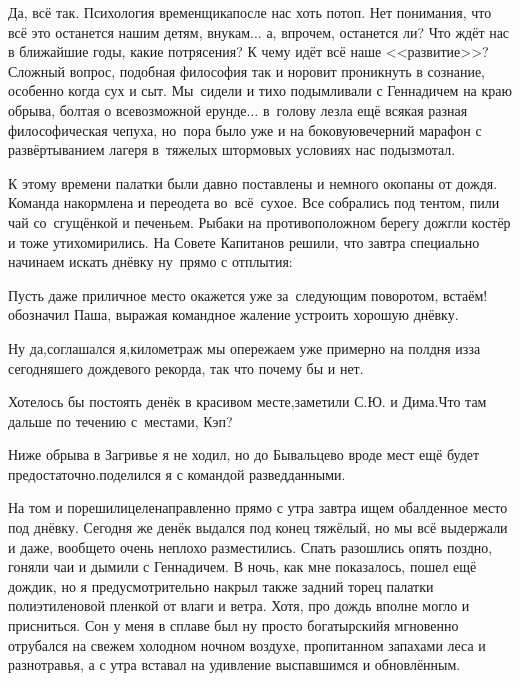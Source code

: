 Да, всё так. Психология временщика\mdash после нас хоть потоп. Нет понимания, что всё это останется нашим детям, внукам$\ldots$ а, впрочем, останется ли? Что ждёт нас в ближайшие годы, какие потрясения? К чему идёт всё наше <<развитие>>? Сложный вопрос, подобная философия так и норовит проникнуть в сознание, особенно когда сух и сыт. Мы~сидели и тихо подымливали с Геннадичем на краю обрыва, болтая о всевозможной ерунде$\ldots$ в~голову лезла ещё всякая разная философическая чепуха, но~пора было уже и на боковую\mdash вечерний марафон с развёртыванием лагеря в~тяжелых штормовых условиях нас подызмотал.

К этому времени палатки были давно поставлены и немного окопаны от дождя. Команда накормлена и переодета во~всё~сухое. Все собрались под тентом, пили чай со~сгущёнкой и печеньем. Рыбаки на противоположном берегу дожгли костёр и тоже утихомирились. На Совете Капитанов решили, что завтра специально начинаем искать днёвку ну~прямо с отплытия:

\diagdash Пусть даже приличное место окажется уже за~следующим поворотом, встаём!\mdash обозначил Паша, выражая командное жаление устроить хорошую днёвку.

\diagdash Ну да,\mdash соглашался я,\mdash километраж мы опережаем уже примерно на полдня из\sdash за сегодняшего дождевого рекорда, так что почему бы и нет.

\diagdash Хотелось бы постоять денёк в красивом месте,\mdash заметили С.Ю. и Дима.\mdash Что там дальше по течению с~местами, Кэп? 

\diagdash Ниже обрыва в Загривье я не ходил, но до Бывальцево вроде мест ещё будет предостаточно.\mdash поделился я с командой разведданными.

На том и порешили\mdash целенаправленно прямо с утра завтра ищем обалденное место под днёвку. Сегодня же денёк выдался под конец тяжёлый, но мы всё выдержали и даже, вообще\sdash то очень неплохо разместились. Спать разошлись опять поздно, гоняли чаи и дымили с Геннадичем. В ночь, как мне показалось, пошел ещё дождик, но я предусмотрительно накрыл также задний торец палатки полиэтиленовой пленкой от влаги и ветра. Хотя, про дождь вполне могло и присниться. Сон у меня в сплаве был ну просто богатырский\mdash я мгновенно отрубался на свежем холодном ночном воздухе, пропитанном запахами леса и разнотравья, а с утра вставал на удивление выспавшимся и обновлённым.%

\begin{center}
\end{center}

